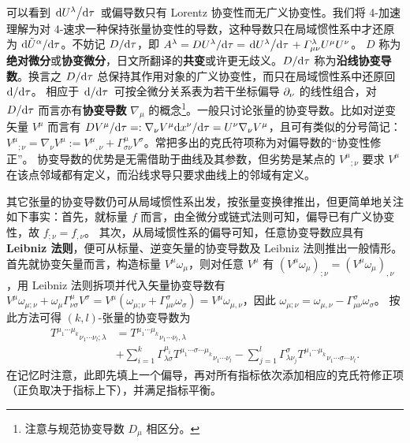 可以看到 $\dv*{U^\lambda}{\tau}$ 或偏导数只有 Lorentz 协变性而无广义协变性。我们将 4-加速理解为对 4-速求一种保持张量协变性的导数，这种导数只在局域惯性系中才还原为 ${\dd\tilde U^\alpha}/{\dd\tau}$。不妨记 $D/\dd\tau$，即 $A^\lambda={D U^\lambda}/{\dd\tau}=\dv*{U^\lambda}{\tau}+\Gamma^\lambda_{\mu\nu}U^\mu U^\nu$。
$D$ 称为\textbf{绝对微分}或\textbf{协变微分}，日文所翻译的\textbf{共变}或许更无歧义。$D/\dd\tau$ 称为\textbf{沿线协变导数}。换言之 $D/\dd\tau$ 总保持其作用对象的广义协变性，而只在局域惯性系中还原回 $\dd/\dd\tau$。
相应于 $\dv*{\tau}$ 可按全微分关系表为若干坐标偏导 $\partial_\nu$ 的线性组合，对 $D/\dd\tau$ 而言亦有\textbf{协变导数} $\nabla_\mu$ 的概念\footnote{注意与规范协变导数 $D_\mu$ 相区分。}。一般只讨论张量的协变导数。比如对逆变矢量 $V^\mu$ 而言有 ${D V^\mu}/{\dd\tau}=:\nabla_\nu V^\mu {\dd x^\nu}/{\dd \tau}=U^\nu\nabla_\nu V^\mu$，且可有类似的分号简记：$V^\mu{}_{;\nu}=\nabla_\nu V^\mu :={V^\mu}{}_{,\nu}+\Gamma^\mu_{\sigma\nu}V^\sigma$。常把多出的克氏符项称为对偏导数的“协变性修正”。
协变导数的优势是无需借助于曲线及其参数，但劣势是某点的 $ V^\mu{}_{;\nu}$ 要求 $V^\mu$ 在该点邻域都有定义，而沿线求导只要求曲线上的邻域有定义。

其它张量的协变导数仍可从局域惯性系出发，按张量变换律推出，但更简单地关注如下事实：首先，就标量 $f$ 而言，由全微分或链式法则可知，偏导已有广义协变性，故 $f_{;\nu}=f_{,\nu}$。
其次，从局域惯性系的偏导可知，任意协变导数应具有\textbf{Leibniz 法则}，便可从标量、逆变矢量的协变导数及 Leibniz 法则推出一般情形。首先就协变矢量而言，构造标量 $V^\mu\omega_\mu$，则对任意 $V^\mu$ 有 $(V^\mu\omega_\mu)_{;\nu} = (V^\mu\omega_\mu)_{,\nu} $，用 Leibniz 法则拆项并代入矢量协变导数有 $V^\mu \omega_{\mu;\nu}+\omega_{\mu}\Gamma^\mu_{\nu\sigma}V^\sigma=V^\mu(\omega_{\mu;\nu}+\Gamma^\sigma_{\mu\nu}\omega_{\sigma})=V^\mu \omega_{\mu,\nu}$，因此 $\omega_{\mu;\nu}=\omega_{\mu,\nu}-\Gamma^\sigma_{\mu\nu}\omega_\sigma$。
按此方法可得 $(k,l)$-张量的协变导数为
\begin{align}\label{eq:cov-tens}
     T^{\mu_1\cdots\mu_k}{}_{\nu_1\cdots\nu_l;\lambda}&=
      T^{\mu_1\cdots\mu_k}{}_{\nu_1\cdots\nu_l,\lambda}\nonumber\\
&+\sum_{i=1}^k \Gamma^{\mu_i}_{\lambda \sigma} T^{\mu_1\cdots\sigma\cdots\mu_k}{}_{\nu_1\cdots\nu_l}-\sum_{j=1}^l\Gamma^{\sigma}_{\lambda \nu_j} T^{\mu_1\cdots\mu_k}{}_{\nu_1\cdots\sigma\cdots\nu_l}.
\end{align}
在记忆时注意，此即先填上一个偏导，再对所有指标依次添加相应的克氏符修正项（正负取决于指标上下），并满足指标平衡。

